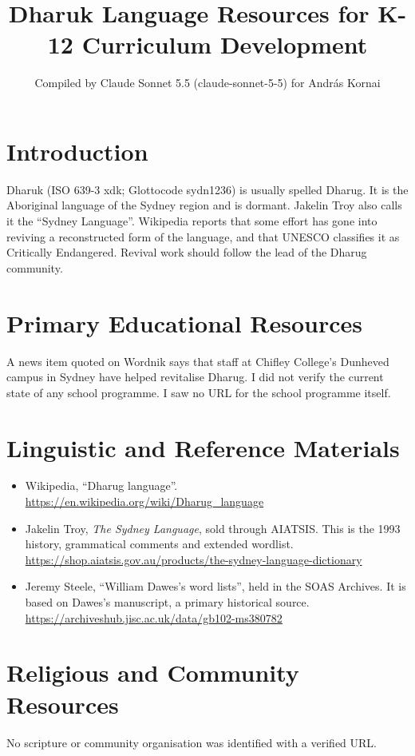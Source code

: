\documentclass[12pt]{article}
\title{Dharuk Language Resources for K-12 Curriculum Development}
\author{Compiled by Claude Sonnet 5.5 (claude-sonnet-5-5) for Andr\'as Kornai}
\date{}
\begin{document}
\maketitle

\section{Introduction}
Dharuk (ISO 639-3 xdk; Glottocode sydn1236) is usually spelled Dharug. It is the Aboriginal language of the Sydney region and is dormant. Jakelin Troy also calls it the ``Sydney Language''. Wikipedia reports that some effort has gone into reviving a reconstructed form of the language, and that UNESCO classifies it as Critically Endangered. Revival work should follow the lead of the Dharug community.

\section{Primary Educational Resources}
A news item quoted on Wordnik says that staff at Chifley College's Dunheved campus in Sydney have helped revitalise Dharug. I did not verify the current state of any school programme. I saw no URL for the school programme itself.

\section{Linguistic and Reference Materials}
\begin{itemize}
\item Wikipedia, ``Dharug language''. \url{https://en.wikipedia.org/wiki/Dharug_language}
\item Jakelin Troy, \emph{The Sydney Language}, sold through AIATSIS. This is the 1993 history, grammatical comments and extended wordlist. \url{https://shop.aiatsis.gov.au/products/the-sydney-language-dictionary}
\item Jeremy Steele, ``William Dawes's word lists'', held in the SOAS Archives. It is based on Dawes's manuscript, a primary historical source. \url{https://archiveshub.jisc.ac.uk/data/gb102-ms380782}
\end{itemize}

\section{Religious and Community Resources}
No scripture or community organisation was identified with a verified URL.
\end{document}
